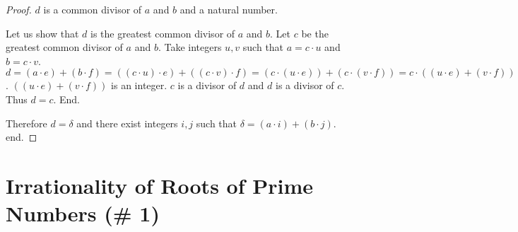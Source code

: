 \documentclass{article}
\begin{document}
\begin{forthel}
\begin{proof}
  $d$ is a common divisor of $a$ and $b$ and a natural number.

  Let us show that $d$ is the greatest common divisor of $a$ and $b$.
    Let $c$ be the greatest common divisor of $a$ and $b$. Take integers $u,v$ such that $a = c \cdot u$ and $b = c \cdot v$.
    $d = (a \cdot e) + (b \cdot f)
    = ((c \cdot u) \cdot e) + ((c \cdot v) \cdot f)
    = (c \cdot (u \cdot e)) + (c \cdot (v \cdot f))
    = c \cdot ((u \cdot e) + (v \cdot f))$.
    $((u \cdot e) + (v \cdot f))$ is an integer. $c$ is a divisor of $d$ and $d$ is a divisor of $c$. Thus $d = c$.
  End.
  
  Therefore $d = \delta$ and
  there exist integers $i,j$ such that $\delta = (a \cdot i) + (b \cdot j)$.
end.
\end{proof}

\end{forthel}


\section{Irrationality of Roots of Prime Numbers (\# 1)}
\end{document}

